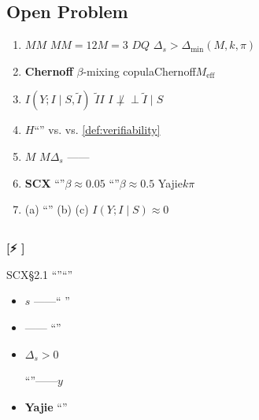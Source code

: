 \documentclass[11pt,a4paper]{article}
\theoremstyle{remark}
\newcommand{\indep}{\perp\!\!\!\perp}
\newcommand{\honestwarning}{\textnormal{\textbf{[⚡ ]}}}
\begin{document}
\subsection{Open Problem}

\begin{enumerate}[label=(\arabic*), leftmargin=*]

    \item \textbf{$M$}$M$
          $M$$M=12$$M=3$
          $D$$Q$
          $\Delta_s > \Delta_{\min}(M, k, \pi)$

    \item \textbf{Chernoff}
          $\beta$-mixing
          copulaChernoff$M_{\text{eff}}$

    \item \textbf{}
          $I(Y; I \mid S, \tilde{I})$
          $\tilde{I}$$I$
          $I \not\indep \tilde{I} \mid S$

    \item \textbf{}$H$``''
           vs.
           vs. \ref{def:verifiability}
          

    \item \textbf{$M$}
          $M$$\Delta_s$\textbf{
          }——
          

    \item \textbf{SCX}
          ``''$\beta \approx 0.05$
          ``''$\beta \approx 0.5$
          Yajie$k$$\pi$
          

    \item \textbf{}
          (a) ``''
          (b) 
          (c) 
          $I(Y; I \mid S)
          \approx 0$

\end{enumerate}

\subsection{}

\honestwarning{} \textbf{}

SCX\S2.1
\textbf{}``''``''

\begin{itemize}
    \item \textbf{}$s$
          ——``
          ''
          \cite{brooks2002narrative}

    \item \textbf{}
          ——
          ``''

    \item \textbf{}$\Delta_s > 0$
          
          ``''——$y$

    \item \textbf{Yajie}
          ``''
          
\end{itemize}
\end{document}
